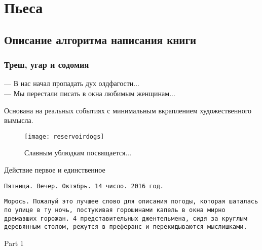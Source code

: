 \section*{Пьеса}
\subsection*{Описание алгоритма написания книги}
\subsubsection*{Треш, угар и содомия} %
\begin{epigraph}
    --- В нас начал пропадать дух олдфагости...\\
    --- Мы перестали писать в окна любимым женщинам...
\end{epigraph}

Основана на реальных событиях с минимальным вкраплением художественного вымысла.\\

\begin{figure}[ht!]
    \centering
    \texttt{[image: reservoirdogs]}
    \caption{Славным ублюдкам посвящается...}
\end{figure}

\begin{center}
    \Large Действие первое и единственное %
\end{center}

{\small\texttt{Пятница. Вечер. Октябрь. 14 число. 2016 год.}}

{\small\texttt{Морось. Пожалуй это лучшее слово для описания погоды, которая шаталась по улице в ту ночь, постукивая горошинами капель в окна мирно дремавших горожан. 4 представительных джентельмена, сидя за круглым деревянным столом, режутся в преферанс и перекидываются мыслишками.}}

\begin{center}
    \large Part 1
\end{center}

